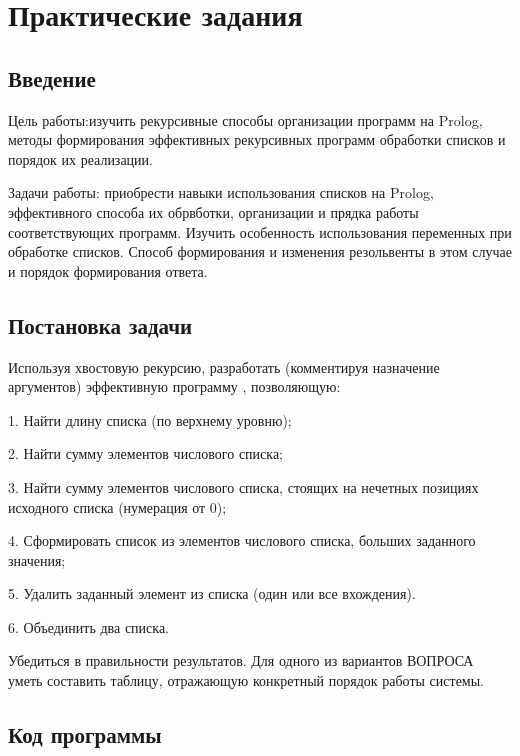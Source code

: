 \documentclass[a4paper, 14pt, unknownkeysallowed]{extreport}
\begin{document}

\setcounter{page}{2}

\chapter{Практические задания}


\section*{Введение}
Цель работы:изучить рекурсивные способы организации программ на Prolog,
методы формирования эффективных рекурсивных программ обработки списков и
порядок их реализации.

Задачи работы: приобрести навыки использования списков на Prolog, эффективного способа
их обрвботки, организации и прядка работы соответствующих программ.
Изучить особенность использования переменных при обработке списков. Способ
формирования и изменения резольвенты в этом случае и порядок формирования ответа.

\section*{Постановка задачи}
Используя хвостовую рекурсию, разработать (комментируя назначение
аргументов) эффективную программу , позволяющую:

1. Найти длину списка (по верхнему уровню);

2. Найти сумму элементов числового списка;

3. Найти сумму элементов числового списка, стоящих на нечетных позициях исходного
списка (нумерация от 0);

4. Сформировать список из элементов числового списка, больших заданного значения;

5. Удалить заданный элемент из списка (один или все вхождения).

6. Объединить два списка.

Убедиться в правильности результатов.
Для одного из вариантов ВОПРОСА уметь составить таблицу, отражающую конкретный
порядок работы системы.

\clearpage
\section{Код программы}


\end{document}
